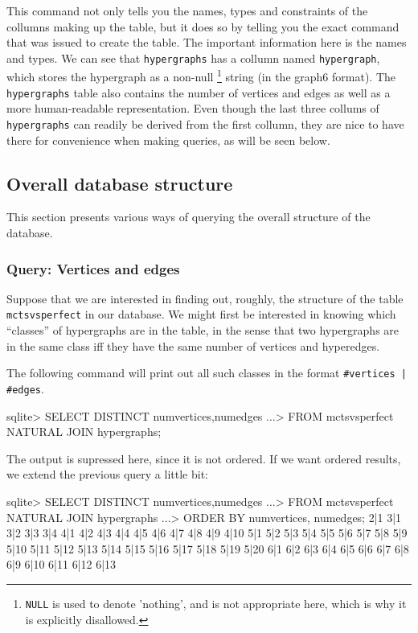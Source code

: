 This command not only tells you the names, types and constraints of the collumns making up the table, but it does so by telling you the exact command that was issued to create the table.
The important information here is the names and types.
We can see that \texttt{hypergraphs} has a collumn named \texttt{hypergraph}, which stores the hypergraph as a non-null \footnote{\texttt{NULL} is used to denote 'nothing', and is not appropriate here, which is why it is explicitly disallowed.} string (in the graph6 format). 
The \texttt{hypergraphs} table also contains the number of vertices and edges as well as a more human-readable representation.
Even though the last three collums of \texttt{hypergraphs} can readily be derived from the first collumn, they are nice to have there for convenience when making queries, as will be seen below.


\subsection{Overall database structure}


This section presents various ways of querying the overall structure of the database.

\subsubsection{Query: Vertices and edges}

Suppose that we are interested in finding out, roughly, the structure of the table \texttt{mctsvsperfect} in our database.
We might first be interested in knowing which ``classes'' of hypergraphs are in the table, in the sense that two hypergraphs are in the same class iff they have the same number of vertices and hyperedges.

The following command will print out all such classes in the format \texttt{\#vertices | \#edges}.



\begin{code}

sqlite> SELECT DISTINCT numvertices,numedges
   ...> FROM mctsvsperfect NATURAL JOIN hypergraphs;
\end{code}

The output is supressed here, since it is not ordered.
If we want ordered results, we extend the previous query a little bit:


\begin{code}

sqlite> SELECT DISTINCT numvertices,numedges
   ...> FROM mctsvsperfect NATURAL JOIN hypergraphs
   ...> ORDER BY numvertices, numedges;
2|1
3|1
3|2
3|3
3|4
4|1
4|2
4|3
4|4
4|5
4|6
4|7
4|8
4|9
4|10
5|1
5|2
5|3
5|4
5|5
5|6
5|7
5|8
5|9
5|10
5|11
5|12
5|13
5|14
5|15
5|16
5|17
5|18
5|19
5|20
6|1
6|2
6|3
6|4
6|5
6|6
6|7
6|8
6|9
6|10
6|11
6|12
6|13


\end{code}


